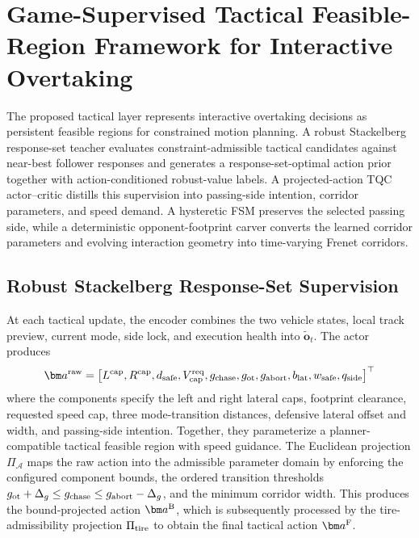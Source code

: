 \documentclass[sensors,article,submit,moreauthors]{Definitions/mdpi}
\begin{document}

\section{Game-Supervised Tactical Feasible-Region Framework for Interactive Overtaking}\label{sec:tactical}

The proposed tactical layer represents interactive overtaking decisions as
persistent feasible regions for constrained motion planning. A robust
Stackelberg response-set teacher evaluates constraint-admissible tactical
candidates against near-best follower responses and generates a
response-set-optimal action prior together with action-conditioned
robust-value labels. A projected-action TQC actor--critic distills this
supervision into passing-side intention, corridor parameters, and speed
demand. A hysteretic FSM preserves the selected passing side, while
a deterministic opponent-footprint carver converts the learned corridor
parameters and evolving interaction geometry into time-varying Frenet
corridors.


\subsection{Robust Stackelberg Response-Set Supervision}
\label{subsec:game_formulation}
At each tactical update, the encoder combines the two vehicle states, local
track preview, current mode, side lock, and execution health into
$\widetilde{\bm o}_t$. The actor produces
\begin{equation}
\bm a^{\rm raw}=\bigl[L^{\rm cap},R^{\rm cap},d_{\rm safe},
V_{\rm cap}^{\rm req},g_{\rm chase},
g_{\rm ot},g_{\rm abort},b_{\rm lat},w_{\rm safe},
q_{\rm side}\bigr]^\top 
\label{eq:action_vec}
\end{equation}
where the components specify the left and right lateral caps, footprint
clearance, requested speed cap, three mode-transition distances, defensive
lateral offset and width, and passing-side intention. Together, they
parameterize a planner-compatible tactical feasible region with speed
guidance. The Euclidean projection $\Pi_{\mathcal A}$ maps the raw action into
the admissible parameter domain by enforcing the configured component bounds,
the ordered transition thresholds
$g_{\rm ot}+\Delta_g\le g_{\rm chase}\le
g_{\rm abort}-\Delta_g$, and the minimum corridor width. This produces the
bound-projected action $\bm a^{\rm B}$, which is subsequently processed by the
tire-admissibility projection $\Pi_{\rm tire}$ to obtain the final tactical
action $\bm a^{\rm F}$.
\end{document}
